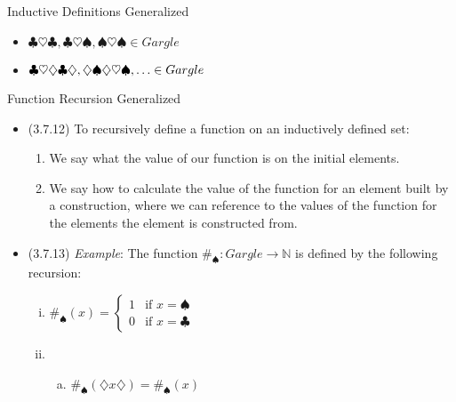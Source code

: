 \begin{frame}{Inductive Definitions Generalized}
\begin{itemize}
\begin{itemize}
					\item $\clubsuit\heartsuit\clubsuit, \clubsuit\heartsuit\spadesuit, \spadesuit\heartsuit\spadesuit\in Gargle$
				
					\item $\clubsuit\heartsuit\diamondsuit\clubsuit\diamondsuit, \diamondsuit\spadesuit\diamondsuit\heartsuit\spadesuit,\mathellipsis\in Gargle$

				
				\end{itemize}
	
	\end{itemize}

\end{frame}

\begin{frame}{Function Recursion Generalized}

	\begin{itemize}
	
		\item (3.7.12) To recursively define a function on an inductively defined set:
		\begin{enumerate}[1.]
		
			\item We say what the value of our function is on the initial elements.
			
			\item We say how to calculate the value of the function for an element built by a construction, where we can reference to the values of the function for the elements the element is constructed from.
		
		\end{enumerate}
		
	\item (3.7.13) \emph{Example}: The function $\#_\spadesuit:Gargle\to\mathbb{N}$ is defined by the following recursion:
		
	\begin{enumerate}[(i)]
		
			\item $\#_\spadesuit(x)=\begin{cases} 1 & \text{if }x=\spadesuit
			\\0 &\text{if }x=\clubsuit\end{cases}$
			
			\item \begin{enumerate}[(a)]
					
					\item  $\#_\spadesuit( \diamondsuit x\diamondsuit)=\#_\spadesuit(x)$


\end{enumerate}
\end{enumerate}
\end{itemize}
\end{frame}
